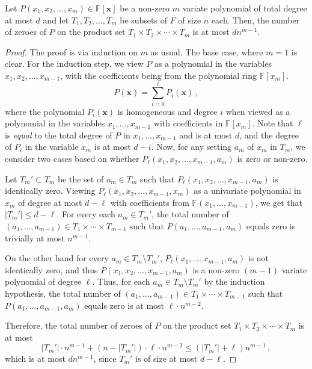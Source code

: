 \documentclass{theoretics}
\def\Field{\mathbb{F}}
\let\F\Field
\def\vecx{\mathbf{x}}
\newcommand{\vx}{\vecx}
\begin{document}
	\begin{lemma}\label{lem: SZ alternate}
		Let $P(x_1, x_2, \ldots, x_m) \in \F[\vx]$ be a non-zero $m$ variate polynomial of total degree at most $d$ and let $T_1, T_2, \ldots, T_m$ be subsets of $F$ of size $n$ each. Then, the number of zeroes of $P$ on the product set $T_1 \times T_2 \times \cdots \times T_m$ is at most $dn^{m-1}$.  
	\end{lemma}
	\begin{proof}
		The proof is via induction on $m$ as usual. The base case, where $m = 1$ is clear. For the induction step, we view $P$ as a polynomial in the variables $x_1, x_2, \ldots, x_{m-1}$, with the coefficients being from the polynomial ring $\F[x_m]$. 
		\[
		P(\vx) = \sum_{i = 0}^{\ell} P_i(\vx) \, , 
		\]
		where the polynomial $P_i(\vx)$ is homogeneous and degree $i$ when viewed as a polynomial in the variables $x_1, \ldots, x_{m-1}$ with coefficients in $\F[x_m]$. Note that $\ell$ is \emph{equal} to the total degree of $P$ in $x_1, \ldots, x_{m-1}$ and is at most $d$, and the degree of $P_i$ in the variable $x_m$ is at most $d-i$. Now, for any setting $a_m$ of $x_m$ in $T_m$,  we consider two cases based on whether $P_{\ell}(x_1, x_2, \ldots, x_{m-1}, a_m)$ is zero or non-zero.  
		
		Let $T_m' \subset T_m$ be the set of $a_m \in T_m$ such that $P_{\ell}(x_1, x_2, \ldots, x_{m-1}, a_m)$ is identically zero. Viewing $P_{\ell}(x_1, x_2, \ldots, x_{m-1}, x_m)$ as a univariate polynomial in $x_m$ of degree at most $d-\ell$ with coefficients from $\F(x_1,\dots,x_{m-1})$, we get that $|T_m'| \leq d-\ell$. For every  each $a_m \in T_m'$, the total number of $(a_1, \ldots, a_{m-1}) \in T_1 \times \cdots \times T_{m-1}$ such that $P(a_1, \ldots, a_{m-1}, a_m)$ equals zero is trivially at most $n^{m-1}$. 
		
		On the other hand for every $a_m \in T_m \setminus T_m'$, $P_{\ell}(x_1, \ldots, x_{m-1}, a_m)$ is not identically zero, and thus $P(x_1, x_2, \ldots, x_{m-1}, a_m)$ is a non-zero $(m-1)$ variate polynomial of degree $\ell$. Thus, for each $a_m \in T_m \setminus T_{m}'$ by the induction hypothesis, the total number of $(a_1, \ldots, a_{m-1}) \in T_1 \times \cdots \times T_{m-1}$ such that $P(a_1, \ldots, a_{m-1}, a_m)$ equals zero is at most $\ell \cdot n^{m-2}$. 
		
		Therefore, the total number of zeroes of $P$ on the product set $T_1 \times T_2 \times \cdots \times T_m$ is at most 
		\[
		|T_m'|\cdot n^{m-1} + (n-|T_m'|)\cdot \ell \cdot n^{m-2} \leq (|T_m'| + \ell )n^{m-1} \, ,
		\]
		which is at most $dn^{m-1}$, since $T_m'$ is of size at most $d-\ell$. 
	\end{proof}
	
\end{document}
